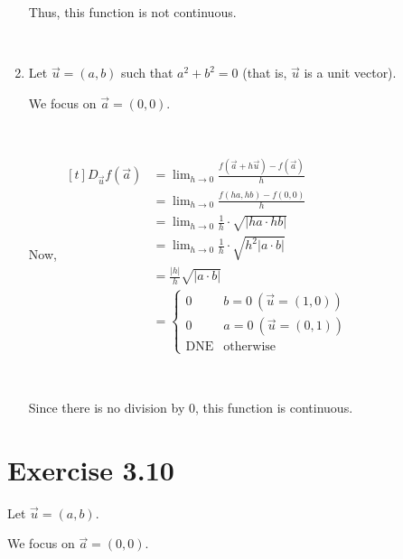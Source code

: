 \documentclass[11pt,fleqn]{book} %
\begin{document}
\begin{enumerate}[label=\alph*)]
    Thus, this function is not continuous. 

    {~~~}

    \item Let $\vec{u} = (a,b)$ such that $a^2 + b^2 = 0$ (that is, $\vec{u}$ is a unit vector). 
    
    We focus on $\vec{a} = (0,0)$. 

    {~~~}

    Now, $\begin{aligned}[t]
        D_{\vec{u}} f(\vec{a}) & = \lim_{h\to0} \frac{f(\vec{a} + h\vec{u}) - f(\vec{a})}{h} \\
                               & = \lim_{h\to0} \frac{f(ha,hb) - f(0,0)}{h}                  \\
                               & = \lim_{h\to0} \frac{1}{h} \cdot \sqrt{| ha \cdot hb |}     \\
                               & = \lim_{h\to0} \frac{1}{h} \cdot \sqrt{h^2 | a \cdot b |}   \\
                               & = \frac{|h|}{h} \sqrt{| a \cdot b |}                        \\
                               & = \begin{cases}
                                       0          & b = 0 ~ (\vec{u} = (1,0)) \\
                                       0          & a = 0 ~ (\vec{u} = (0,1)) \\
                                       \text{DNE} & \text{otherwise}
                                   \end{cases}
        \end{aligned}$

        {~~~}

        Since there is no division by $0$, this function is continuous. 
\end{enumerate}

\section*{Exercise 3.10}

Let $\vec{u} = (a,b)$. 

We focus on $\vec{a} = (0,0)$. 
\end{document}
